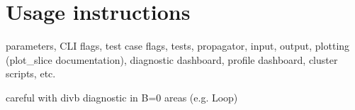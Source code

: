 \section{Usage instructions}

parameters, CLI flags, test case flags, tests, propagator, input, output, plotting (plot\_slice documentation), diagnostic dashboard, profile dashboard, cluster scripts, etc.

careful with divb diagnostic in B=0 areas (e.g. Loop)

